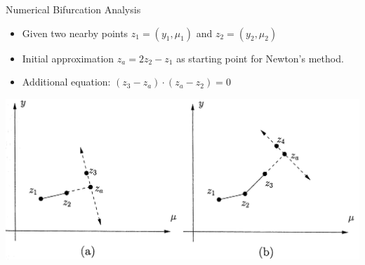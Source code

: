 \documentclass{beamer}
\begin{document}
\begin{frame}{Numerical Bifurcation Analysis}
    
    \begin{itemize}
        \item Given two nearby points $z_{1} = (y_{1}, \mu_{1})$ and $z_2 = (y_2, \mu_2)${}
        \item Initial approximation $ z_{a} = 2 z_{2} - z_{1}$ as starting point for Newton's method.
        \item Additional equation: $(z_3 - z_a) \cdot (z_a - z_2) = 0$
    \end{itemize}
    \includegraphics[width=\textwidth]{grafik/pathfollow}

\end{frame}
\end{document}

